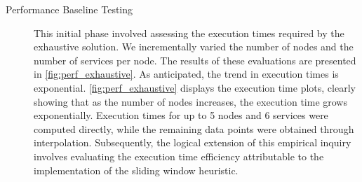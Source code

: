 \begin{description}
  \item[Performance Baseline Testing] This initial phase involved assessing the execution times required by the exhaustive solution.
        We incrementally varied the number of nodes and the number of services per node.
        The results of these evaluations are presented in \cref{fig:perf_exhaustive}.
        As anticipated, the trend in execution times is exponential. \cref{fig:perf_exhaustive} displays the execution time plots,
        clearly showing that as the number of nodes increases, the execution time grows exponentially.
        Execution times for up to 5 nodes and 6 services were computed directly,
        while the remaining data points were obtained through interpolation.
        Subsequently, the logical extension of this empirical inquiry involves evaluating the execution time efficiency attributable to the implementation of the sliding window heuristic.


\end{description}
